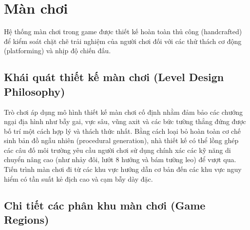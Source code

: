 \documentclass[../DoAn.tex]{subfiles}
\begin{document}
\section{Màn chơi}
Hệ thống màn chơi trong game được thiết kế hoàn toàn thủ công (handcrafted) để kiểm soát chặt chẽ trải nghiệm của người chơi đối với các thử thách cơ động (platforming) và nhịp độ chiến đấu.

\subsection{Khái quát thiết kế màn chơi (Level Design Philosophy)}
\label{subsection:3.8.1}

Trò chơi áp dụng mô hình thiết kế màn chơi cố định nhằm đảm bảo các chướng ngại địa hình như bẫy gai, vực sâu, vũng axit và các bức tường thẳng đứng được bố trí một cách hợp lý và thách thức nhất. Bằng cách loại bỏ hoàn toàn cơ chế sinh bản đồ ngẫu nhiên (procedural generation), nhà thiết kế có thể lồng ghép các câu đố môi trường yêu cầu người chơi sử dụng chính xác các kỹ năng di chuyển nâng cao (như nhảy đôi, lướt 8 hướng và bám tường leo) để vượt qua. Tiến trình màn chơi đi từ các khu vực hướng dẫn cơ bản đến các khu vực nguy hiểm có tần suất kẻ địch cao và cạm bẫy dày đặc.

\subsection{Chi tiết các phân khu màn chơi (Game Regions)}
\label{subsection:3.8.2}
\end{document}
